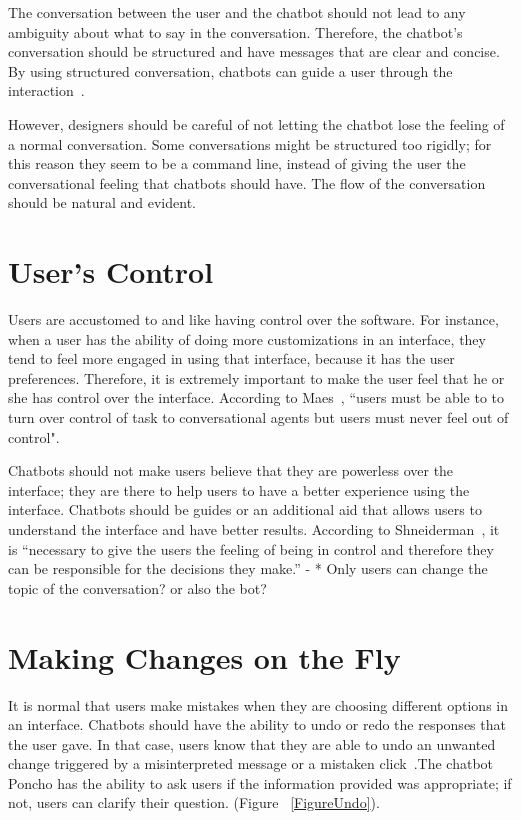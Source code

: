 \documentclass[a4paper,10pt]{article}
\begin{document}
The conversation between the user and the chatbot should not lead to any ambiguity about what to say in the conversation. Therefore, the chatbot's conversation should be structured and have messages that are clear and concise. By using structured conversation, chatbots can guide a user through the interaction~\cite{HeuristicsWebPage}.

However, designers should be careful of not letting the chatbot lose the feeling of a normal conversation. Some conversations might be structured too rigidly; for this reason they seem to be a command line, instead of giving the user the conversational feeling that chatbots should have. The flow of the conversation should be natural and evident. 

\section{User's Control}

Users are accustomed to and like having control over the software. For instance, when a user has the ability of doing more customizations in an interface, they tend to feel more engaged in using that interface, because it has the user preferences. Therefore, it is extremely important to make the user feel that he or she has control over the interface. According to Maes~\cite{shneiderman1997direct}, ``users must be able to to turn over control of task to conversational agents but users must never feel out of control".

Chatbots should not make users believe that they are powerless over the interface; they are there to help users to have a better experience using the interface. Chatbots should be guides or an additional aid that allows users to understand the interface and have better results. According to Shneiderman~\cite{shneiderman1997direct}, it is ``necessary to give the users the feeling of being in control and therefore they can be responsible for the decisions they make.” - * Only users can change the topic of the conversation? or also the bot?

\section{Making Changes on the Fly}

It is normal that users make mistakes when they are choosing different options in an interface. Chatbots should have the ability to undo or redo the responses that the user gave. In that case, users know that they are able to undo an unwanted change triggered by a misinterpreted message or a mistaken click~\cite{HeuristicsWebPage}.The chatbot Poncho has the ability to ask users if the information provided was appropriate; if not, users can clarify their question. 
(Figure ~\ref{FigureUndo}).  
\end{document}
